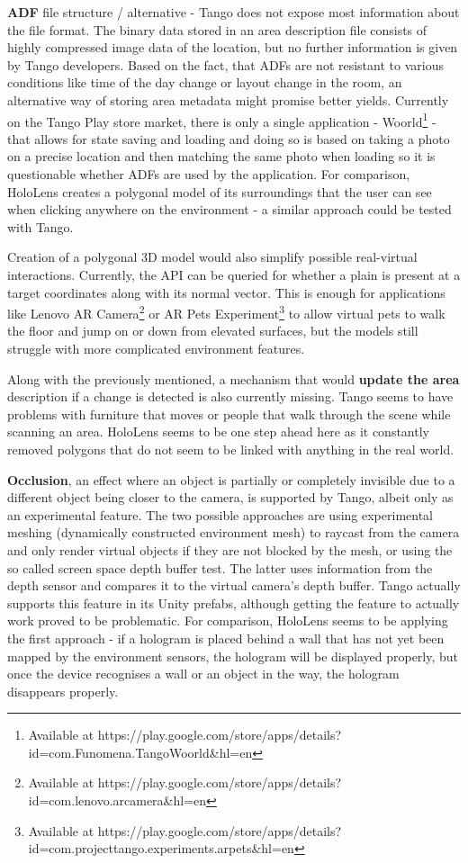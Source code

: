 \documentclass[12pt, a4paper]{article}
\begin{document}
\textbf{ADF} file structure / alternative - Tango does not expose most information about the file format. The binary data stored in an area description file consists of highly compressed image data of the location, but no further information is given by Tango developers. Based on the fact, that ADFs are not resistant to various conditions like time of the day change or layout change in the room, an alternative way of storing area metadata might promise better yields. Currently on the Tango Play store market, there is only a single application - Woorld\footnote{Available at https://play.google.com/store/apps/details?id=com.Funomena.TangoWoorld\&hl=en} - that allows for state saving and loading and doing so is based on taking a photo on a precise location and then matching the same photo when loading so it is questionable whether ADFs are used by the application. For comparison, HoloLens creates a polygonal model of its surroundings that the user can see when clicking anywhere on the environment - a similar approach could be tested with Tango.

Creation of a polygonal 3D model would also simplify possible real-virtual interactions. Currently, the API can be queried for whether a plain is present at a target coordinates along with its normal vector. This is enough for applications like Lenovo AR Camera\footnote{Available at https://play.google.com/store/apps/details?id=com.lenovo.arcamera\&hl=en} or AR Pets Experiment\footnote{Available at https://play.google.com/store/apps/details?id=com.projecttango.experiments.arpets\&hl=en} to allow virtual pets to walk the floor and jump on or down from elevated surfaces, but the models still struggle with more complicated environment features.

Along with the previously mentioned, a mechanism that would \textbf{update the area} description if a change is detected is also currently missing. Tango seems to have problems with furniture that moves or people that walk through the scene while scanning an area. HoloLens seems to be one step ahead here as it constantly removed polygons that do not seem to be linked with anything in the real world.

\textbf{Occlusion}, an effect where an object is partially or completely invisible due to a different object being closer to the camera, is supported by Tango, albeit only as an experimental feature. The two possible approaches are using experimental meshing (dynamically constructed environment mesh) to raycast from the camera and only render virtual objects if they are not blocked by the mesh, or using the so called screen space depth buffer test. The latter uses information from the depth sensor and compares it to the virtual camera’s depth buffer. Tango actually supports this feature in its Unity prefabs, although getting the feature to actually work proved to be problematic. For comparison, HoloLens seems to be applying the first approach - if a hologram is placed behind a wall that has not yet been mapped by the environment sensors, the hologram will be displayed properly, but once the device recognises a wall or an object in the way, the hologram disappears properly.
\end{document}
